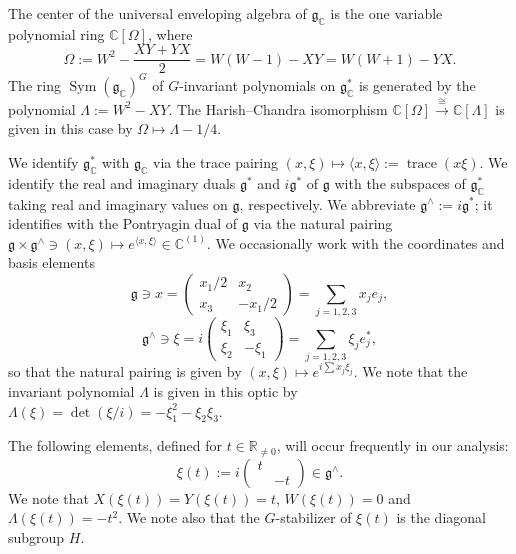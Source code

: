 \documentclass[reqno,10pt]{amsart}
\theoremstyle{plain} %
\theoremstyle{definition}
\theoremstyle{plain} %
\theoremstyle{remark}
\theoremstyle{itplain} %
\theoremstyle{remark} %
\numberwithin{equation}{section}
\DeclareMathOperator{\trace}{trace}
\DeclareMathOperator{\Sym}{Sym}
\begin{document}
The center of the universal enveloping algebra of $\mathfrak{g}_\mathbb{C}$ is the one variable polynomial ring $\mathbb{C}[\Omega]$, where
\[
  \Omega := W^2 - \frac{X Y + Y X}{2} = W(W-1) - X Y = W(W+1) - Y X.
\]
The ring $\Sym(\mathfrak{g}_\mathbb{C})^G$ of $G$-invariant polynomials on $\mathfrak{g}_\mathbb{C}^*$ is generated by the polynomial $\Lambda := W^2 - X Y$.  The Harish--Chandra isomorphism $\mathbb{C}[\Omega] \xrightarrow{\cong } \mathbb{C}[\Lambda]$ is given in this case by $\Omega \mapsto \Lambda - 1/4$.

We identify $\mathfrak{g}_\mathbb{C}^*$ with $\mathfrak{g}_\mathbb{C}$ via the trace pairing $(x,\xi) \mapsto \langle x, \xi \rangle := \trace(x \xi)$.  We identify the real and imaginary duals $\mathfrak{g}^*$ and $i \mathfrak{g}^*$ of $\mathfrak{g}$ with the subspaces of $\mathfrak{g}_\mathbb{C}^*$ taking real and imaginary values on $\mathfrak{g}$, respectively.  We abbreviate $\mathfrak{g}^\wedge := i \mathfrak{g}^*$; it identifies with the Pontryagin dual of $\mathfrak{g}$ via the natural pairing $\mathfrak{g} \times \mathfrak{g}^\wedge \ni (x,\xi) \mapsto e^{\langle x, \xi \rangle} \in \mathbb{C}^{(1)}$.  We occasionally work with the coordinates and basis elements
\[
  \mathfrak{g} \ni x = \begin{pmatrix}
    x_1/2 & x_2    \\
    x_3 & -x_1/2
  \end{pmatrix}
  = \sum_{j=1,2,3} x_j e_j,
\]
\[
  \mathfrak{g}^\wedge \ni \xi = i
  \begin{pmatrix}
    \xi_1 & \xi_3  \\
    \xi_2 & -\xi_1
  \end{pmatrix}
  = \sum_{j=1,2,3} \xi_j e_j^*,
\]
so that the natural pairing is given by $(x,\xi) \mapsto e^{i \sum x_j \xi_j}$.  We note that the invariant polynomial $\Lambda$ is given in this optic by $\Lambda(\xi) = \det(\xi/i) = - \xi_1^2 - \xi_2 \xi_3$.

The following elements, defined for $t \in \mathbb{R}_{\neq 0}$, will occur frequently in our analysis:
\begin{equation}\label{eqn:defn-xi-of-t}
  \xi(t) :=
  i \begin{pmatrix}
    t &  \\
    & -t
  \end{pmatrix} \in \mathfrak{g}^\wedge.
\end{equation}
We note that $X(\xi(t)) = Y(\xi(t)) = t$,  $W(\xi(t)) = 0$ and $\Lambda(\xi(t)) = -t^2$.  We note also that the $G$-stabilizer of $\xi(t)$ is the diagonal subgroup $H$.
\end{document}
